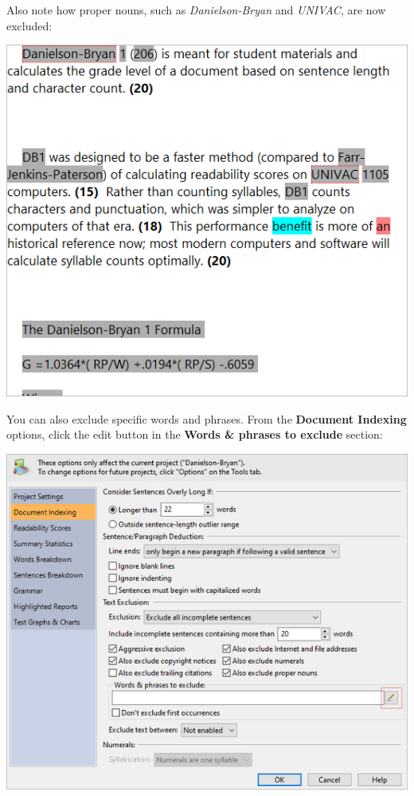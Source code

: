 \documentclass[
]{book}
\theoremstyle{definition}
\theoremstyle{definition}
\theoremstyle{definition}
\theoremstyle{definition}
\theoremstyle{remark}
\begin{document}
Also note how proper nouns, such as \emph{Danielson-Bryan} and \emph{UNIVAC}, are now excluded:

\includegraphics{Images/ExclusionExampleProperExcludedNow.png}

You can also exclude specific words and phrases. From the \textbf{Document Indexing} options, click the edit button in the \textbf{Words \& phrases to exclude} section:

\includegraphics{Images/ExclusionExampleEditListButton.png}
\end{document}
